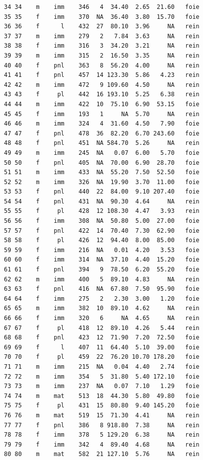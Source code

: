 \documentclass[
  a4paper,
  DIV=11,
  numbers=noendperiod,
  oneside]{scrreprt}
\begin{document}
\begin{verbatim}
34 34    m    imm    346   4  34.40  2.65  21.60   foie
35 35    f    imm    370  NA  36.40  3.80  15.70   foie
36 36    f      l    432  27  80.10  3.96     NA   rein
37 37    m    imm    279   2   7.84  3.63     NA   rein
38 38    f    imm    316   3  34.20  3.21     NA   rein
39 39    m    imm    315   2  16.50  3.35     NA   rein
40 40    f    pnl    363   8  56.20  4.00     NA   rein
41 41    f    pnl    457  14 123.30  5.86   4.23   rein
42 42    m    imm    472   9 109.60  4.50     NA   rein
43 43    f     pl    442  16 193.10  5.25   6.38   rein
44 44    m    imm    422  10  75.10  6.90  53.15   foie
45 45    f    imm    193   1     NA  5.70     NA   rein
46 46    m    imm    324   4  31.60  4.50   7.90   foie
47 47    f    pnl    478  36  82.20  6.70 243.60   foie
48 48    f    pnl    451  NA 584.70  5.26     NA   rein
49 49    m    imm    245  NA   0.07  6.00   5.70   foie
50 50    f    pnl    405  NA  70.00  6.90  28.70   foie
51 51    m    imm    433  NA  55.20  7.50  52.50   foie
52 52    m    imm    326  NA  19.90  3.70  11.00   foie
53 53    f    pnl    440  22  84.00  9.10 207.40   foie
54 54    f    pnl    431  NA  90.30  4.64     NA   rein
55 55    f     pl    428  12 108.30  4.47   3.93   rein
56 56    f    imm    308  NA  50.80  5.00  27.00   foie
57 57    f    pnl    422  14  70.40  7.30  62.90   foie
58 58    f     pl    426  12  94.40  8.00  85.00   foie
59 59    f    imm    216  NA   0.01  4.20   3.53   foie
60 60    f    imm    314  NA  37.10  4.40  15.20   foie
61 61    f    pnl    394   9  78.50  6.20  55.20   foie
62 62    m    imm    400   5  89.10  4.83     NA   rein
63 63    f    pnl    416  NA  67.80  7.50  95.90   foie
64 64    f    imm    275   2   2.30  3.00   1.20   foie
65 65    m    imm    382  10  89.10  4.62     NA   rein
66 66    f    imm    320   6     NA  4.65     NA   rein
67 67    f     pl    418  12  89.10  4.26   5.44   rein
68 68    f    pnl    423  12  71.90  7.20  72.50   foie
69 69    f      l    407  11  64.40  5.10  39.00   foie
70 70    f     pl    459  22  76.20 10.70 178.20   foie
71 71    m    imm    215  NA   0.04  4.40   2.74   foie
72 72    m    imm    354   5  31.80  5.40 172.10   foie
73 73    m    imm    237  NA   0.07  7.10   1.29   foie
74 74    m    mat    513  18  44.30  5.80  49.80   foie
75 75    f     pl    431  15  80.80  9.40 145.20   foie
76 76    m    mat    519  15  71.30  4.41     NA   rein
77 77    f    pnl    386   8 918.80  7.38     NA   rein
78 78    f    imm    378   5 129.20  6.38     NA   rein
79 79    f    imm    342   4  89.40  4.68     NA   rein
80 80    m    mat    582  21 127.10  5.76     NA   rein

\end{verbatim}
\end{document}
